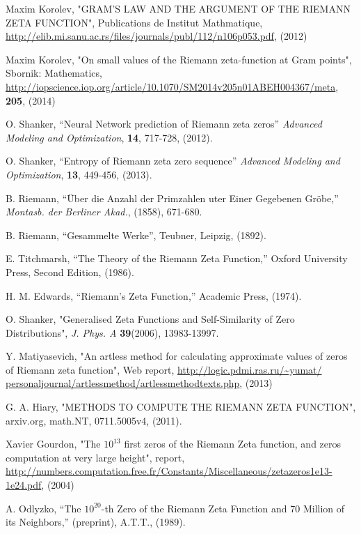 \documentclass[twoside]{article}
\begin{document}
 
\begin{thebibliography}{10} 

 Maxim Korolev,
"GRAM'S LAW AND THE ARGUMENT
OF THE RIEMANN ZETA FUNCTION", Publications de Institut Mathmatique,
\url{http://elib.mi.sanu.ac.rs/files/journals/publ/112/n106p053.pdf}, (2012)

 Maxim Korolev,
"On small values of the Riemann zeta-function at Gram points", Sbornik: Mathematics,
\url{http://iopscience.iop.org/article/10.1070/SM2014v205n01ABEH004367/meta},
{\bf205}, (2014)

 O. Shanker, ``Neural Network prediction of Riemann zeta zeros''
{\it Advanced Modeling and Optimization}, {\bf 14}, 717-728, (2012). 

 O. Shanker, ``Entropy of Riemann zeta zero sequence''
{\it Advanced Modeling and Optimization}, {\bf 13}, 449-456, (2013). 

 B. Riemann, ``\"{U}ber die Anzahl der Primzahlen uter
Einer Gegebenen Gr\"{o}be,'' {\it Montasb. der Berliner Akad.}, (1858),
671-680.

 B. Riemann, ``Gesammelte Werke'', Teubner, Leipzig, (1892).

 E. Titchmarsh, ``The Theory of the Riemann Zeta
Function,'' Oxford University Press, Second Edition, (1986).

 H. M. Edwards, ``Riemann's Zeta Function,'' 
Academic Press,  (1974).

 O. Shanker, 
"Generalised Zeta Functions and Self-Similarity of Zero Distributions",
{\it J.  Phys. A} {\bf39}(2006), 13983-13997.

 Y. Matiyasevich, 
"An artless method for calculating approximate values of
zeros of Riemann zeta function",
Web report, \url{http://logic.pdmi.ras.ru/~yumat/
personaljournal/artlessmethod/artlessmethodtexts.php}, (2013)

 G. A. Hiary,
"METHODS TO COMPUTE THE RIEMANN ZETA
FUNCTION", arxiv.org, math.NT, 0711.5005v4, (2011).

 Xavier Gourdon,
"The $10^{13}$ first zeros of the Riemann Zeta function,
and zeros computation at very large height", report,
\url{http://numbers.computation.free.fr/Constants/Miscellaneous/zetazeros1e13-1e24.pdf}, (2004)

 A. Odlyzko, ``The $10^{20}$-th Zero of the Riemann Zeta
Function and 70 Million of its Neighbors,'' (preprint), A.T.T., (1989).

\end{thebibliography} 
\end{document}
